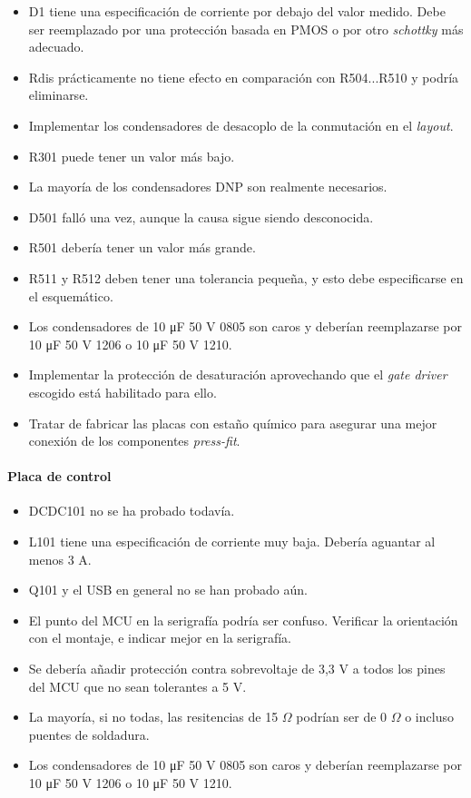 \begin{itemize}
	\item D1 tiene una especificación de corriente por debajo del valor medido. Debe ser reemplazado por una protección basada en PMOS o por otro \textit{schottky} más adecuado.
	\item Rdis prácticamente no tiene efecto en comparación con R504...R510 y podría eliminarse.
	\item Implementar los condensadores de desacoplo de la conmutación en el \textit{layout}.
	\item R301 puede tener un valor más bajo.
	\item La mayoría de los condensadores DNP son realmente necesarios.
	\item D501 falló una vez, aunque la causa sigue siendo desconocida.
	\item R501 debería tener un valor más grande.
	\item R511 y R512 deben tener una tolerancia pequeña, y esto debe especificarse en el esquemático.
	\item Los condensadores de 10 \unit{\micro\farad} 50 V 0805 son caros y deberían reemplazarse por 10 \unit{\micro\farad} 50 V 1206 o 10 \unit{\micro\farad} 50 V 1210.
	\item Implementar la protección de desaturación aprovechando que el \textit{gate driver} escogido está habilitado para ello.
	\item Tratar de fabricar las placas con estaño químico para asegurar una mejor conexión de los componentes \textit{press-fit}.	
\end{itemize}

\paragraph{Placa de control}

\begin{itemize}
	\item DCDC101 no se ha probado todavía.
	\item L101 tiene una especificación de corriente muy baja. Debería aguantar al menos 3 A.
	\item Q101 y el USB en general no se han probado aún.
	\item El punto del MCU en la serigrafía podría ser confuso. Verificar la orientación con el montaje, e indicar mejor en la serigrafía.
	\item Se debería añadir protección contra sobrevoltaje de 3,3 V a todos los pines del MCU que no sean tolerantes a 5 V.
	\item La mayoría, si no todas, las resitencias de 15 $\Omega$ podrían ser de 0 $\Omega$ o incluso puentes de soldadura.
	\item Los condensadores de 10 \unit{\micro\farad} 50 V 0805 son caros y deberían reemplazarse por 10 \unit{\micro\farad} 50 V 1206 o 10 \unit{\micro\farad} 50 V 1210.
\end{itemize}

